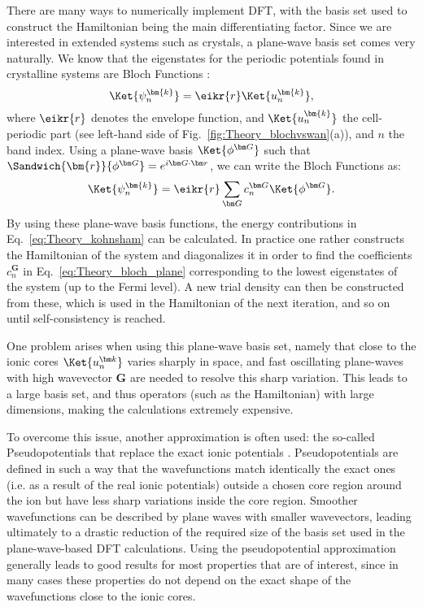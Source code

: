 There are many ways to numerically implement DFT, with the basis set used to construct the Hamiltonian being the main differentiating factor.
Since we are interested in extended systems such as crystals, a plane-wave basis set comes very naturally.
We know that the eigenstates for the periodic potentials found in crystalline systems are Bloch Functions \cite{Ashcroft}:
\begin{equation}
	\Ket{\psi^{\bm{k}}_n} = \eikr{r} \Ket{u^{\bm{k}}_n},
\end{equation}
where $\eikr{r}$ denotes the envelope function, and $\Ket{u^{\bm{k}}_n}$ the cell-periodic part (see left-hand side of Fig.~\ref{fig:Theory_blochvswan}(a)), and $n$ the band index.
Using a plane-wave basis $\Ket{\phi^{\bm G}}$ such that $\Sandwich{\bm{r}}{\phi^{\bm G}} = e^{i\bm G \cdot \bm r}$, we can write the Bloch Functions as:
\begin{equation}
	\label{eq:Theory_bloch_plane}
\Ket{\psi_n^{\bm{k}}} = \eikr{r} \sum_{\bm G} c_n^{\bm G} \Ket{\phi^{\bm G}}.
\end{equation}
By using these plane-wave basis functions, the energy contributions in Eq.~\eqref{eq:Theory_kohnsham} can be calculated.
In practice one rather constructs the Hamiltonian of the system and diagonalizes it in order to find the coefficients $c_n^{\bm G}$ in Eq.~\eqref{eq:Theory_bloch_plane} corresponding to the lowest eigenstates of the system (up to the Fermi level).
A new trial density can then be constructed from these, which is used in the Hamiltonian of the next iteration, and so on until self-consistency is reached.

One problem arises when using this plane-wave basis set, namely that close to the ionic cores $\Ket{u_n^{\bm k}}$ varies sharply in space, and fast oscillating plane-waves with high wavevector $\bm G$ are needed to resolve this sharp variation.
This leads to a large basis set, and thus operators (such as the Hamiltonian) with large dimensions, making the calculations extremely expensive.

To overcome this issue, another approximation is often used: the so-called Pseudopotentials that replace the exact ionic potentials \cite{Hamann1979,Louie1982,Vanderbilt1990,Joubert1999}.
Pseudopotentials are defined in such a way that the wavefunctions match identically the exact ones (i.e. as a result of the real ionic potentials) outside a chosen core region around the ion but have less sharp variations inside the core region.
Smoother wavefunctions can be described by plane waves with smaller wavevectors, leading ultimately to a drastic reduction of the required size of the basis set used in the plane-wave-based DFT calculations.
Using the pseudopotential approximation generally leads to good results for most properties that are of interest, since in many cases these properties do not depend on the exact shape of the wavefunctions close to the ionic cores.

